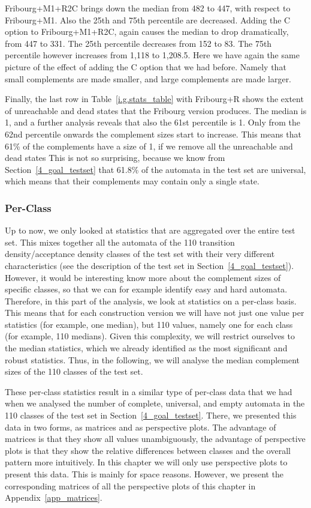 Fribourg+M1+R2C brings down the median from 482 to 447, with respect to Fribourg+M1. Also the 25th and 75th percentile are decreased. Adding the C option to Fribourg+M1+R2C, again causes the median to drop dramatically, from 447 to 331. The 25th percentile decreases from 152 to 83. The 75th percentile however increases from 1,118 to 1,208.5. Here we have again the same picture of the effect of adding the C option that we had before. Namely that small complements are made smaller, and large complements are made larger.

Finally, the last row in Table~\ref{i.g.stats_table} with Fribourg+R shows the extent of unreachable and dead states that the Fribourg version produces. The median is 1, and a further analysis reveals that also the 61st percentile is 1. Only from the 62nd percentile onwards the complement sizes start to increase. This means that 61\% of the complements have a size of 1, if we remove all the unreachable and dead states This is not so surprising, because we know from Section~\ref{4_goal_testset} that 61.8\% of the automata in the \goal{} test set are universal, which means that their complements may contain only a single state.

\subsubsection{Per-Class}
Up to now, we only looked at statistics that are aggregated over the entire test set. This mixes together all the automata of the 110 transition density/acceptance density classes of the \goal{} test set with their very different characteristics (see the description of the \goal{} test set in Section~\ref{4_goal_testset}). However, it would be interesting know more about the complement sizes of specific classes, so that we can for example identify easy and hard automata. Therefore, in this part of the analysis, we look at statistics on a per-class basis. This means that for each construction version we will have not just one value per statistics (for example, one median), but 110 values, namely one for each class (for example, 110 medians). Given this complexity, we will restrict ourselves to the median statistics, which we already identified as the most significant and robust statistics. Thus, in the following, we will analyse the median complement sizes of the 110 classes of the \goal{} test set.

These per-class statistics result in a similar type of per-class data that we had when we analysed the number of complete, universal, and empty automata in the 110 classes of the \goal{} test set in Section~\ref{4_goal_testset}. There, we presented this data in two forms, as matrices and as perspective plots. The advantage of matrices is that they show all values unambiguously, the advantage of perspective plots is that they show the relative differences between classes and the overall pattern more intuitively. In this chapter we will only use perspective plots to present this data. This is mainly for space reasons. However, we present the corresponding matrices of all the perspective plots of this chapter in Appendix~\ref{app_matrices}.

